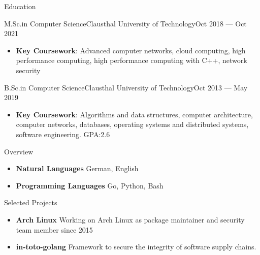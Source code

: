\documentclass[]{mcdowellcv}
\begin{document}
\begin{cvsection}{Education}
\begin{cvsubsection}{M.Sc.\@ in Computer Science}{Clausthal University of Technology}{Oct 2018 --- Oct 2021}
\bigskip
\begin{itemize}
\item \textbf{Key Coursework}: Advanced computer networks, cloud computing, high performance computing, high performance computing with C++, network security
\end{itemize}
\end{cvsubsection}
\begin{cvsubsection}{B.Sc.\@ in Computer Science}{Clausthal University of Technology}{Oct 2013 --- May 2019}
\bigskip
\begin{itemize}
\item \textbf{Key Coursework}: Algorithms and data structures, computer architecture, computer networks, databases, operating systems and distributed systems, software engineering. GPA:\@ 2.6
\end{itemize}
\end{cvsubsection}

\begin{cvsection}{Overview}
\begin{cvsubsection}{}{}{}
\begin{itemize}
\item \textbf{Natural Languages} German, English
\item \textbf{Programming Languages} Go, Python, Bash
\end{itemize}
\end{cvsubsection}
\end{cvsection}

\end{cvsection}
\begin{cvsection}{Selected Projects}
\begin{cvsubsection}{}{}{}
\begin{itemize}
\item \textbf{Arch Linux} Working on Arch Linux as package maintainer and security team member since 2015
\item \textbf{in-toto-golang} Framework to secure the integrity of software supply chains.
\end{itemize}
\end{cvsubsection}
\end{cvsection}
\end{document}
